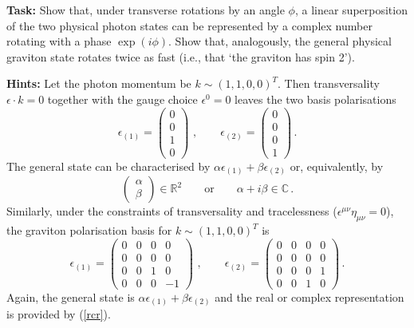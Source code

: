 \documentclass[12pt]{article}
\newcommand{\be}{\begin{equation}}
\newcommand{\ee}{\end{equation}}
\numberwithin{equation}{section}
\begin{document}
{\bf Task:} Show that, under transverse rotations by an angle $\phi$, a linear superposition of the two physical photon states can be represented by a complex number rotating with a phase $\exp(i\phi)$. Show that, analogously, the general physical graviton state rotates twice as fast (i.e., that `the graviton has spin 2'). 

\noindent
{\bf Hints:} Let the photon momentum be $k\sim (1,1,0,0)^T$. Then transversality $\epsilon\cdot k=0$ together with the gauge choice $\epsilon^0=0$ leaves the two basis polarisations
\be
\epsilon_{(1)}=\left(\begin{array}{c}0 \\ 0 \\ 1\\ 0 \end{array}\right)\,\,,
\qquad
\epsilon_{(2)}=\left(\begin{array}{c}0 \\ 0 \\ 0\\ 1 \end{array}\right)\,.
\ee
The general state can be characterised by $\alpha\epsilon_{(1)} +\beta\epsilon_{(2)}$ or, equivalently, by
\be
\left(\begin{array}{c}\alpha \\ \beta\end{array}\right)\in \mathbb{R}^2\qquad 
\mbox{or}\qquad \alpha+i\beta\in \mathbb{C}\,.\label{rcr}
\ee
Similarly, under the constraints of transversality and tracelessness ($\epsilon^{\mu\nu}\eta_{\mu\nu}=0$), the graviton polarisation basis for $k\sim (1,1,0,0)^T$ is
\be
\epsilon_{(1)}=\left(\begin{array}{cccr}0&0&0&0 \\ 0&0&0&0 \\ 0&0&1&0 \\ 0&0&0&-1 \end{array}\right)\,\,,
\qquad
\epsilon_{(2)}=\left(\begin{array}{cccc}0&0&0&0 \\ 0&0&0&0 \\ 0&0&0&1 \\ 0&0&1&0 \end{array}\right)\,.
\ee
Again, the general state is $\alpha\epsilon_{(1)} +\beta\epsilon_{(2)}$ and the real or complex representation is provided by (\ref{rcr}). 
\end{document}
